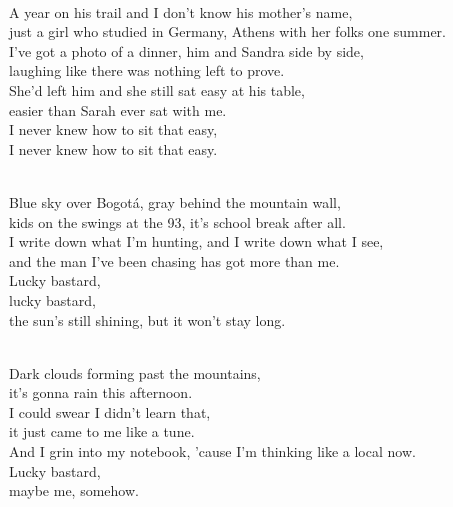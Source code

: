 \begin{lyrics}
\\
A year on his trail and I don't know his mother's name,\\
just a girl who studied in Germany, Athens with her folks one summer.\\
I've got a photo of a dinner, him and Sandra side by side,\\
laughing like there was nothing left to prove.\\
She'd left him and she still sat easy at his table,\\
easier than Sarah ever sat with me.\\
I never knew how to sit that easy,\\
I never knew how to sit that easy.

\\
Blue sky over Bogotá, gray behind the mountain wall,\\
kids on the swings at the 93, it's school break after all.\\
I write down what I'm hunting, and I write down what I see,\\
and the man I've been chasing has got more than me.\\
Lucky bastard,\\
lucky bastard,\\
the sun's still shining, but it won't stay long.

\\
Dark clouds forming past the mountains,\\
it's gonna rain this afternoon.\\
I could swear I didn't learn that,\\
it just came to me like a tune.\\
And I grin into my notebook,
'cause I'm thinking like a local now.\\
Lucky bastard,\\
maybe me, somehow.
\end{lyrics}

